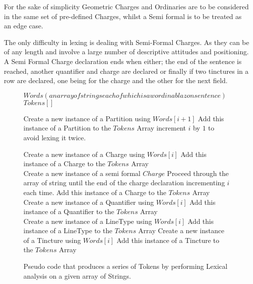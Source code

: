 For the sake of simplicity Geometric Charges and Ordinaries are to be considered in the same set of pre-defined Charges,  whilst a Semi formal is to be treated as an edge case. 

The only difficulty in lexing is dealing with Semi-Formal Charges.  As they can be of any length and involve a large number of descriptive attitudes and positioning.   A Semi Formal Charge declaration ends when either; the end of the sentence is reached, another quantifier and charge are declared or finally if two tinctures in a row are declared, one being for the charge and the other for the next field. 

\begin{figure}[H]
\begin{algorithmic}[1]



\STATE $Words (an array of strings each of which is a word in a blazon sentence) $ 
\STATE $Tokens[]$ \\

		\STATE Create a new instance of a Partition using $Words[i+1]$
		\STATE Add this instance of a Partition to the $Tokens$ Array
		\STATE increment $i$ by $1$ to avoid lexing it twice. 

		\STATE Create a new instance of a Charge using $Words[i]$
		\STATE Add this instance of a Charge to the $Tokens$ Array \\

		\STATE Create a new instance of a semi formal $Charge$ 
		\STATE Proceed through the array of string until the end of the charge declaration incrementing $i$ each time.  
		\STATE Add this instance of a Charge to the $Tokens$ Array
		\STATE Create a new instance of a Quantifier using $Words[i]$
		\STATE Add this instance of a Quantifier to the $Tokens$ Array \\

		\STATE Create a new instance of a LineType using $Words[i]$
		\STATE Add this instance of a LineType to the $Tokens$ Array
		\STATE Create a new instance of a Tincture using $Words[i]$
		\STATE Add this instance of a Tincture to the $Tokens$ Array
 	\ENDIF
\ENDFOR



\end{algorithmic}
\caption{Pseudo code that produces a series of Tokens by performing Lexical analysis on a given array of Strings.}
\end{figure}



